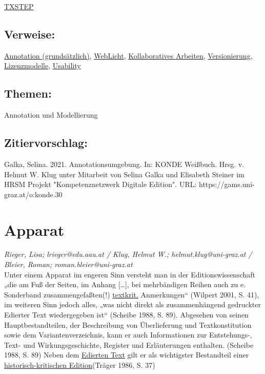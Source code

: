 \documentclass{article}
\begin{document}
\href{http://www.txstep.de}{TXSTEP}\subsection*{Verweise:}\href{https://gams.uni-graz.at/o:konde.17}{Annotation (grundsätzlich)}, \href{https://gams.uni-graz.at/o:konde.12}{WebLicht}, \href{https://gams.uni-graz.at/o:konde.104}{Kollaboratives Arbeiten}, \href{https://gams.uni-graz.at/o:konde.14}{Versionierung}, \href{https://gams.uni-graz.at/o:konde.9}{Lizenzmodelle}, \href{https://gams.uni-graz.at/o:konde.205}{Usability}\subsection*{Themen:}Annotation und Modellierung\subsection*{Zitiervorschlag:}Galka, Selina. 2021. Annotationsumgebung. In: KONDE Weißbuch. Hrsg. v. Helmut W. Klug unter Mitarbeit von Selina Galka und Elisabeth Steiner im HRSM Projekt "Kompetenznetzwerk Digitale Edition". URL: https://gams.uni-graz.at/o:konde.30\newpage\section*{Apparat} \emph{Rieger, Lisa; lrieger@edu.aau.at / Klug, Helmut W.; helmut.klug@uni-graz.at / Bleier, Roman; roman.bleier@uni-graz.at }\\
        
    Unter einem Apparat im engeren Sinn versteht man in der Editionswissenschaft „die am Fuß der Seiten, im Anhang […], bei mehrbändigen Reihen auch zu e. Sonderband zusammengefaßten(!) \href{http://gams.uni-graz.at/o:konde.192}{textkrit.} Anmerkungen“ (Wilpert 2001, S. 41), im weiteren Sinn jedoch alles, „was nicht direkt als zusammenhängend gedruckter Edierter Text wiedergegeben ist“ (Scheibe 1988, S. 89). Abgesehen von seinen Hauptbestandteilen, der Beschreibung von Überlieferung und Textkonstitution sowie dem Variantenverzeichnis, kann er auch Informationen zur Entstehungs-, Text- und Wirkungsgeschichte, Register und Erläuterungen enthalten. (Scheibe 1988, S. 89) Neben dem \href{http://gams.uni-graz.at/o:konde.75}{Edierten Text} gilt er als wichtigster Bestandteil einer \href{http://gams.uni-graz.at/o:konde.93.}{historisch-kritischen Edition}(Träger 1986, S. 37)\\
            
\end{document}
